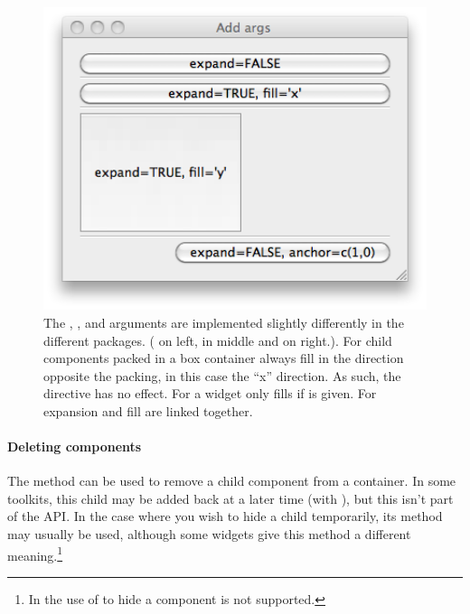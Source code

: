 \begin{figure}
\begin{minipage}[c]{.32\linewidth}
    \includegraphics[width=1\textwidth]{fig-gWidgets-expand-Qt.png}    
  \end{minipage}
  \caption{
    The , , and  arguments are
    implemented slightly differently in the different
    packages. ( on left,  in
    middle and  on right.). For \GTK\/ child
    components packed in a box container always fill in the direction
    opposite the packing, in this case the ``x'' direction. As such,
    the  directive has no effect. For
     a widget only fills if  is given.
    For  expansion and fill are linked together.
  }
  \label{fig:gWidgets-ggroup-expand-fill-anchor}
\end{figure}


\paragraph{Deleting components}
The  method can be used to remove a child
component from a container. In some toolkits, this child may be added
back at a later time (with ), but this isn't part
of the API. In the case where you wish to hide a child temporarily,
its  method may usually be used, although some
widgets give this method a different meaning.\footnote{In
   the use of  to hide a
  component is not supported.}





